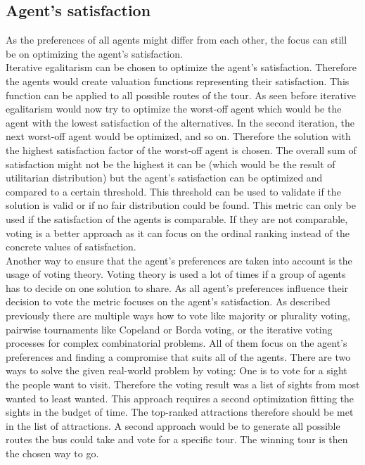 \documentclass[german, a4paper, 11pt, oneside]{scrbook}
\begin{document}
\subsection{Agent's satisfaction}
As the preferences of all agents might differ from each other, the focus can still be on optimizing the agent's satisfaction. 
\\Iterative egalitarism can be chosen to optimize the agent's satisfaction. Therefore the agents would create valuation functions representing their satisfaction. This function can be applied to all possible routes of the tour. As seen before iterative egalitarism would now try to optimize the worst-off agent which would be the agent with the lowest satisfaction of the alternatives. In the second iteration, the next worst-off agent would be optimized, and so on. Therefore the solution with the highest satisfaction factor of the worst-off agent is chosen. The overall sum of satisfaction might not be the highest it can be (which would be the result of utilitarian distribution) but the agent's satisfaction can be optimized and compared to a certain threshold. This threshold can be used to validate if the solution is valid or if no fair distribution could be found. This metric can only be used if the satisfaction of the agents is comparable. If they are not comparable, voting is a better approach as it can focus on the ordinal ranking instead of the concrete values of satisfaction.
\\Another way to ensure that the agent's preferences are taken into account is the usage of voting theory. Voting theory is used a lot of times if a group of agents has to decide on one solution to share. As all agent's preferences influence their decision to vote the metric focuses on the agent's satisfaction. As described previously there are multiple ways how to vote like majority or plurality voting, pairwise tournaments like Copeland or Borda voting, or the iterative voting processes for complex combinatorial problems. All of them focus on the agent's preferences and finding a compromise that suits all of the agents. There are two ways to solve the given real-world problem by voting: One is to vote for a sight the people want to visit. Therefore the voting result was a list of sights from most wanted to least wanted. This approach requires a second optimization fitting the sights in the budget of time. The top-ranked attractions therefore should be met in the list of attractions. A second approach would be to generate all possible routes the bus could take and vote for a specific tour. The winning tour is then the chosen way to go.
\end{document}
